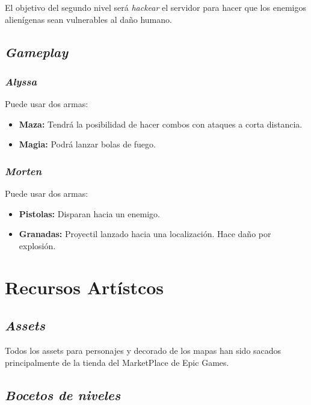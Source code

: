 \documentclass[11pt, twoside]{article}
\begin{document}
El objetivo del segundo nivel será \textit{hackear} el servidor para hacer que los enemigos alienígenas sean vulnerables al daño humano. 
\newpage

\pagestyle{insection}
\subsection{\textit{Gameplay}}

\subsubsection{\textit{Alyssa}}
Puede usar dos armas:
\begin{itemize}
	\item \textbf{Maza:} Tendrá la posibilidad de hacer combos con ataques a corta distancia.
	\item \textbf{Magia:} Podrá lanzar bolas de fuego.
\end{itemize}

\subsubsection{\textit{Morten}}
Puede usar dos armas:
\begin{itemize}
	\item \textbf{Pistolas:} Disparan hacia un enemigo.
	\item \textbf{Granadas:} Proyectil lanzado hacia una localización. Hace daño por explosión. 
\end{itemize}


\pagestyle{insection}
\section{Recursos Artístcos}

\subsection{\textit{Assets}}
Todos los assets para personajes y decorado de los mapas han sido sacados principalmente de la tienda del MarketPlace de Epic Games.

\subsection{\textit{Bocetos de niveles}}
\end{document}
